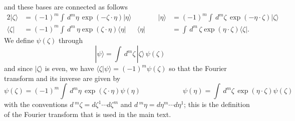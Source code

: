 \documentclass[a4paper,10pt]{article}
\begin{document}
and these bases are connected as follows
\begin{alignat}{2}
|\zeta\rangle& =(-1)^m\int\,d^{m}\eta \,\exp(-\zeta\cdot\eta)|\eta\rangle 
&\qquad\quad|\eta\rangle& =(-1)^m\int\,d^{m}\zeta\,\exp(-\eta\cdot\zeta)|\zeta\rangle\\
\langle\zeta|& =(-1)^m\int\,d^{m}\,\eta\exp(\zeta\cdot\eta)\langle\eta|&
\langle\eta|& =\int\,d^{m}\,\zeta\exp(\eta\cdot\zeta)\langle\zeta|.
\end{alignat}
We define $\psi(\zeta)$ through
\begin{equation}
|\psi\rangle=\int\,d^{m}\zeta\,|\zeta\rangle\,\psi(\zeta)
\end{equation}
and since $|\zeta\rangle$ is even, we have $\langle\zeta|\psi\rangle=(-1)^m\psi(\zeta)$ 
so that the Fourier transform and its inverse are given by
\begin{equation}
\psi(\zeta)=(-1)^m\int\,d^{m}\eta\,\exp(\zeta\cdot\eta)\psi(\eta)\qquad\qquad\qquad
\psi(\eta)=\int\,d^{m}\zeta\,\exp(\eta\cdot\zeta)\psi(\zeta)
\end{equation}
with the conventions $d\,^m\zeta=d\zeta^1\cdots d\zeta^m$ and $d\,^m\eta=d\eta^m\cdots 
d\eta^1$; this is the definition of the Fourier transform that is used in the main text.
\end{document}
